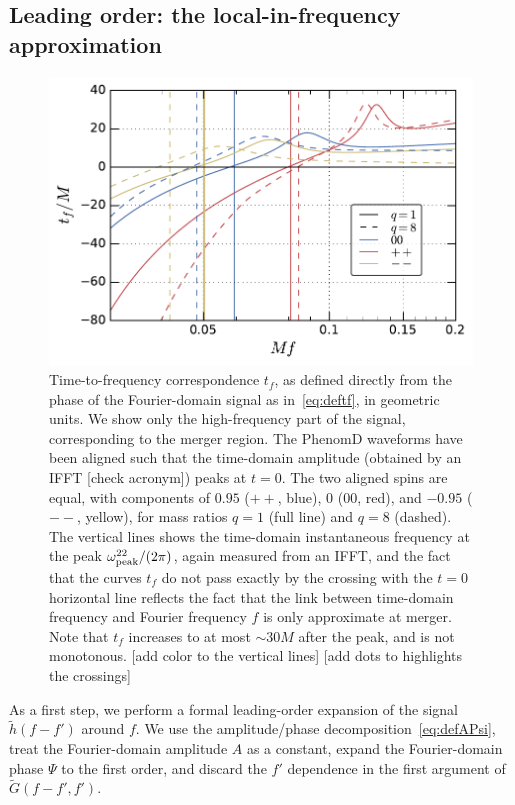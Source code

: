 \documentclass[aps,showpacs,twocolumn,
prd,superscriptaddress,nofootinbib]{revtex4-1}
\newcommand{\SM}[1]{{\color{Red} #1}}
\begin{document}

\subsection{Leading order: the local-in-frequency approximation}
\label{subsec:LLP}

\begin{figure}
  \centering
  \includegraphics[width=.98\linewidth]{plots/tf_py.pdf}
  \caption{Time-to-frequency correspondence $t_{f}$, as defined directly from the phase of the Fourier-domain signal as in~\eqref{eq:deftf}, in geometric units. We show only the high-frequency part of the signal, corresponding to the merger region. The PhenomD waveforms have been aligned such that the time-domain amplitude (obtained by an IFFT \SM{[check acronym]}) peaks at $t=0$. The two aligned spins are equal, with components of $0.95$ ($++$, blue), $0$ ($00$, red), and $-0.95$ ($--$, yellow), for mass ratios $q=1$ (full line) and $q=8$ (dashed). The vertical lines shows the time-domain instantaneous frequency at the peak $\omega^{22}_{\rm peak}/(2\pi)$, again measured from an IFFT, and the fact that the curves $t_{f}$ do not pass exactly by the crossing with the $t=0$ horizontal line reflects the fact that the link between time-domain frequency and Fourier frequency $f$ is only approximate at merger. Note that $t_{f}$ increases to at most $\sim 30M$ after the peak, and is not monotonous. \SM{[add color to the vertical lines]} \SM{[add dots to highlights the crossings]}}
  \label{fig:tf}
\end{figure}

As a first step, we perform a formal leading-order expansion of the signal $\tilde{h}(f-f')$ around $f$. We use the amplitude/phase decomposition~\eqref{eq:defAPsi}, treat the Fourier-domain amplitude $A$ as a constant, expand the Fourier-domain phase $\Psi$ to the first order, and discard the $f'$ dependence in the first argument of $\tilde{G}(f-f', f')$.
\end{document}
